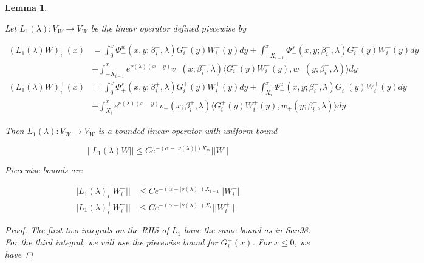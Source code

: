 \documentclass[12pt]{article}
\newtheorem{lemma}{Lemma}
\begin{document}
\begin{lemma}\label{L1}

Let $L_1(\lambda): V_W \rightarrow V_W$ be the linear operator defined piecewise by

\begin{align*}
(L_1(\lambda)W)_i^-(x) &= \int_0^x \Phi^u_-(x, y; \beta_i^-, \lambda) G_i^-(y)W_i^-(y) dy + \int_{-X_{i-1}}^x \Phi^s_-(x, y; \beta_i^-, \lambda) G_i^-(y)W_i^-(y) dy \\
&+ \int_{-X_{i-1}}^x 
e^{\nu(\lambda)(x-y)} v_-(x; \beta_i^-, \lambda) \langle G_i^-(y)W_i^-(y), w_-(y; \beta_i^-, \lambda) \rangle dy \\
(L_1(\lambda)W)_i^+(x) &= \int_0^x \Phi^s_+(x, y; \beta_i^+, \lambda) G_i^+(y) W_i^+(y) dy + \int_{X_i}^x \Phi^u_+(x, y; \beta_i^+, \lambda) G_i^+(y) W_i^+(y) dy \\
&+ \int_{X_i}^x e^{\nu(\lambda)(x-y)} v_+(x; \beta_i^+, \lambda) \langle G_i^+(y)W_i^+(y), w_+(y; \beta_i^+, \lambda) \rangle dy
\end{align*}

Then $L_1(\lambda): V_W \rightarrow V_W$ is a bounded linear operator with uniform bound

\begin{equation}\label{L1bound2}
||L_1(\lambda)W|| \leq C e^{-(\alpha -|\nu(\lambda)|)X_m} ||W||
\end{equation}

Piecewise bounds are

\begin{align*}
||L_1(\lambda)_i^- W_i^-|| &\leq C e^{-(\alpha -|\nu(\lambda)|)X_{i-1}} ||W_i^-|| \\
||L_1(\lambda)_i^+ W_i^+|| &\leq C e^{-(\alpha -|\nu(\lambda)|)X_i} ||W_i^+||
\end{align*}

\begin{proof}
The first two integrals on the RHS of $L_1$ have the same bound as in San98. For the third integral, we will use the piecewise bound for $G_i^\pm(x)$. For $x \leq 0$, we have


\end{proof}
\end{lemma}
\end{document}
